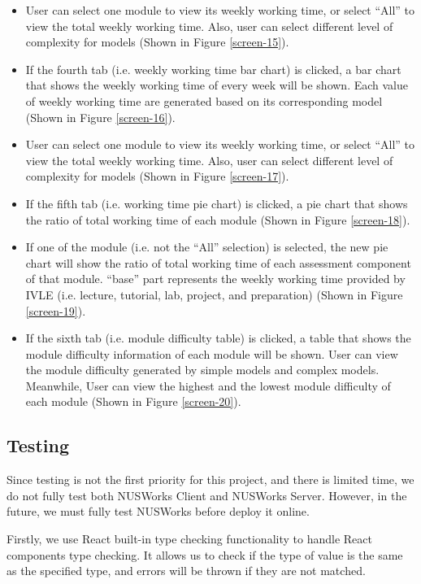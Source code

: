 \documentclass[fyp]{socreport}
\begin{document}
\begin{itemize}
	\item User can select one module to view its weekly working time, or select “All” to view the total weekly working time. Also, user can select different level of complexity for models (Shown in Figure {\ref{screen-15}}).
	\item If the fourth tab (i.e. weekly working time bar chart) is clicked, a bar chart that shows the weekly working time of every week will be shown. Each value of weekly working time are generated based on its corresponding model (Shown in Figure {\ref{screen-16}}).
	\item User can select one module to view its weekly working time, or select “All” to view the total weekly working time. Also, user can select different level of complexity for models (Shown in Figure {\ref{screen-17}}).
	\item If the fifth tab (i.e. working time pie chart) is clicked, a pie chart that shows the ratio of total working time of each module (Shown in Figure {\ref{screen-18}}).
	\item If one of the module (i.e. not the “All” selection) is selected, the new pie chart will show the ratio of total working time of each assessment component of that module. “base” part represents the weekly working time provided by IVLE (i.e. lecture, tutorial, lab, project, and preparation) (Shown in Figure {\ref{screen-19}}).
	\item If the sixth tab (i.e. module difficulty table) is clicked, a table that shows the module difficulty information of each module will be shown. User can view the module difficulty generated by simple models and complex models. Meanwhile, User can view the highest and the lowest module difficulty of each module (Shown in Figure {\ref{screen-20}}).
\end{itemize}

\subsection{Testing}
Since testing is not the first priority for this project, and there is limited time, we do not fully test both NUSWorks Client and NUSWorks Server. However, in the future, we must fully test NUSWorks before deploy it online.

Firstly, we use React built-in type checking functionality to handle React components type checking. It allows us to check if the type of value is the same as the specified type, and errors will be thrown if they are not matched.
\end{document}
